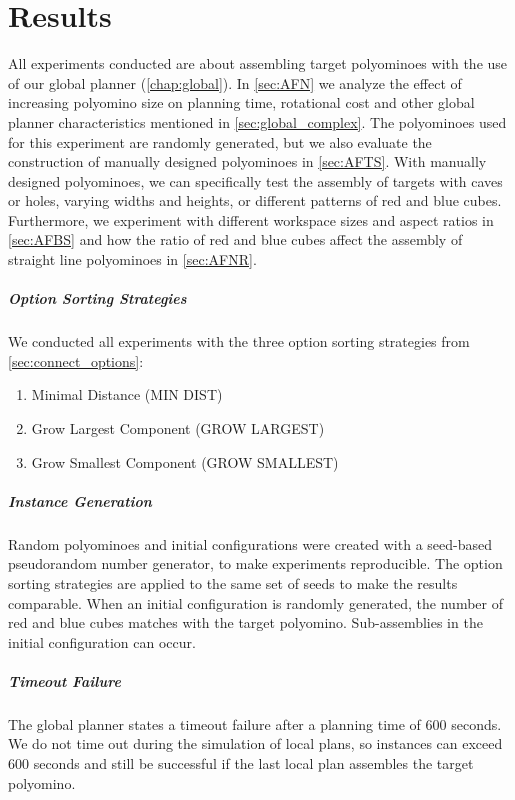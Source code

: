 \chapter{Results}
\label{chap:results}

All experiments conducted are about assembling target polyominoes with the use of our global planner (\autoref{chap:global}).
In \autoref{sec:AFN} we analyze the effect of increasing polyomino size on planning time, rotational cost and other global planner characteristics mentioned in \autoref{sec:global_complex}.
The polyominoes used for this experiment are randomly generated, but we also evaluate the construction of manually designed polyominoes in \autoref{sec:AFTS}.
With manually designed polyominoes, we can specifically test the assembly of targets with caves or holes, varying widths and heights, or different patterns of red and blue cubes. 
Furthermore, we experiment with different workspace sizes and aspect ratios in \autoref{sec:AFBS} and how the ratio of red and blue cubes affect the assembly of straight line polyominoes in \autoref{sec:AFNR}.

\paragraph{Option Sorting Strategies}
We conducted all experiments with the three option sorting strategies from \autoref{sec:connect_options}:
\begin{enumerate}
	\item Minimal Distance (MIN DIST)
	\item Grow Largest Component (GROW LARGEST)
	\item Grow Smallest Component (GROW SMALLEST)
\end{enumerate}

\paragraph{Instance Generation}
Random polyominoes and initial configurations were created with a seed-based pseudorandom number generator, to make experiments reproducible.
The option sorting strategies are applied to the same set of seeds to make the results comparable.
When an initial configuration is randomly generated, the number of red and blue cubes matches with the target polyomino.
Sub-assemblies in the initial configuration can occur.

\paragraph{Timeout Failure}
The global planner states a timeout failure after a planning time of $600$ seconds.
We do not time out during the simulation of local plans, so instances can exceed $600$ seconds and still be successful if the last local plan assembles the target polyomino.

